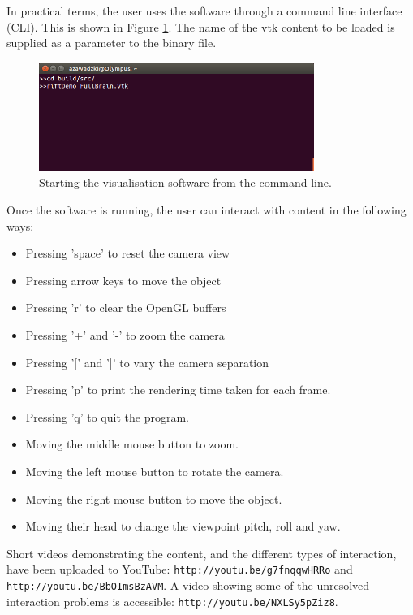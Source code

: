 \documentclass[MSc,paper=a4,pagesize=auto]{icldt}
\begin{document}
In practical terms, the user uses the software through a command line interface (CLI). This is shown in Figure \ref{fig:command_line_interface}. The name of the vtk content to be loaded is supplied as a parameter to the binary file.

\begin{figure}[htbp!]
    \centering
    \includegraphics[width=0.8\textwidth]{resources/command_line_interface}
    \caption{Starting the visualisation software from the command line.}
    \label{fig:command_line_interface}
\end{figure}

Once the software is running, the user can interact with content in the following ways:
\begin{itemize}
\item Pressing 'space' to reset the camera view
\item Pressing arrow keys to move the object
\item Pressing 'r' to clear the OpenGL buffers
\item Pressing '+' and '-' to zoom the camera
\item Pressing '[' and ']' to vary the camera separation
\item Pressing 'p' to print the rendering time taken for each frame.
\item Pressing 'q' to quit the program.
\item Moving the middle mouse button to zoom.
\item Moving the left mouse button to rotate the camera.
\item Moving the right mouse button to move the object.
\item Moving their head to change the viewpoint pitch, roll and yaw.
\end{itemize}

Short videos demonstrating the content, and the different types of interaction, have been uploaded to YouTube: \texttt{http://youtu.be/g7fnqqwHRRo} and \texttt{http://youtu.be/BbOImsBzAVM}. A video showing some of the unresolved interaction problems is accessible: \texttt{http://youtu.be/NXLSy5pZiz8}.
\end{document}
